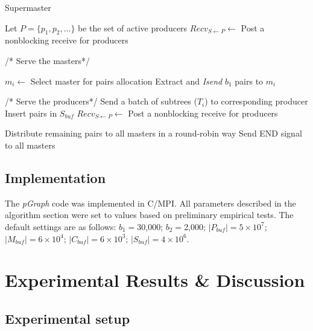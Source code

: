 \documentclass[10pt,journal,letterpaper,compsoc]{IEEEtran}
\begin{document}
\begin{algorithm}
\caption{Supermaster}
\label{sp}
\begin{algorithmic}[1]
	\STATE Let $P=\{p_1, p_2, ...\}$ be the set of active producers
	\STATE $Recv_{S\leftarrow P}\leftarrow$ Post a nonblocking receive for producers
			
	    
	    \STATE /* Serve the masters*/        
	    	
	    	\STATE $m_i\leftarrow$ Select master for pairs allocation
		    \STATE Extract and {\it Isend} $b_1$ pairs to $m_i$ 
		    	
		    \ENDIF
		    \STATE /* Serve the producers*/        
		             \STATE Send a batch of subtrees ($T_i$) to corresponding producer
			        \STATE Insert pairs in $S_{buf}$
		        \ENDIF
		        \STATE $Recv_{S\leftarrow P}\leftarrow$ Post a nonblocking receive for producers
		    \ENDIF
	    
	    
    \ENDWHILE

	\STATE Distribute remaining pairs to all masters in a round-robin way
	\STATE Send END signal to all masters
\end{algorithmic}
\end{algorithm}


\subsection{Implementation}
The {\it pGraph} code was implemented in C/MPI. All parameters described in the algorithm section were set to values based on preliminary empirical tests.  The default settings are as follows: $b_1=$30,000; $b_2=$2,000; $|P_{buf}|=5\times 10^7$; $|M_{buf}|=6\times 10^4$; $|C_{buf}|=6\times 10^3$; $|S_{buf}|=4\times 10^6$. 


\section{Experimental Results \& Discussion}
\label{secResults}


\subsection{Experimental setup} 
\end{document}
